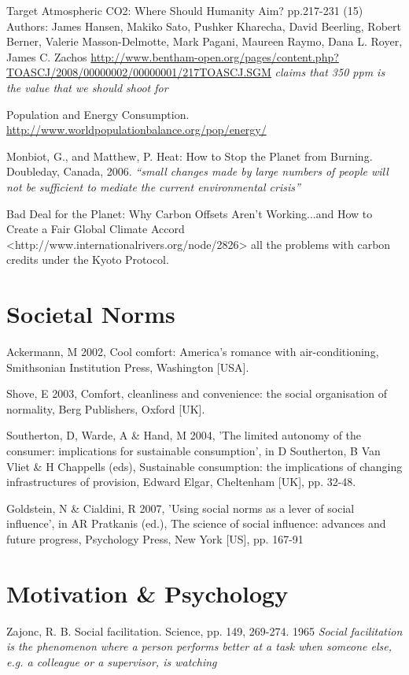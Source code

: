 Target Atmospheric CO2: Where Should Humanity Aim? pp.217-231 (15) Authors: James Hansen, Makiko Sato, Pushker Kharecha, David Beerling, Robert Berner, Valerie Masson-Delmotte, Mark Pagani, Maureen Raymo, Dana L. Royer, James C. Zachos \url{http://www.bentham-open.org/pages/content.php?TOASCJ/2008/00000002/00000001/217TOASCJ.SGM} \emph{claims that 350 ppm is the \COtwo value that we should shoot for}

Population and Energy Consumption. \url{http://www.worldpopulationbalance.org/pop/energy/}

Monbiot, G., and Matthew, P.  Heat: How to Stop the Planet from Burning.  Doubleday, Canada, 2006. \emph{``small changes made by large numbers of people will not be sufficient to mediate the current environmental crisis''}

Bad Deal for the Planet: Why Carbon Offsets Aren't Working...and How to Create a Fair Global Climate Accord <http://www.internationalrivers.org/node/2826> all the problems with carbon credits under the Kyoto Protocol.


\section{Societal Norms}
Ackermann, M 2002, Cool comfort: America's romance with air-conditioning, Smithsonian Institution Press, Washington [USA].

Shove, E 2003, Comfort, cleanliness and convenience: the social organisation of normality, Berg Publishers, Oxford [UK].

Southerton, D, Warde, A \& Hand, M 2004, 'The limited autonomy of the consumer: implications for sustainable consumption', in D Southerton, B Van Vliet \& H Chappells (eds), Sustainable consumption: the implications of changing infrastructures of provision, Edward Elgar, Cheltenham [UK], pp. 32-48.

Goldstein, N \& Cialdini, R 2007, 'Using social norms as a lever of social influence', in AR Pratkanis (ed.), The science of social influence: advances and future progress, Psychology Press, New York [US], pp. 167-91


\section{Motivation \& Psychology}
Zajonc, R. B. Social facilitation. Science, pp. 149, 269-274. 1965 \emph{Social facilitation is the phenomenon where a person performs better at a task when someone else, e.g. a colleague or a supervisor, is watching}

